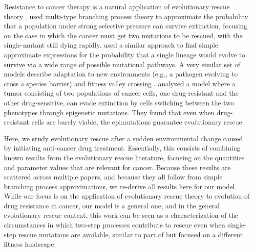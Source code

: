\documentclass[12pt]{extarticle}
\begin{document}
Resistance to cancer therapy is a natural application of evolutionary rescue theory \citep{alexander2014evolutionary}. 
\citet{iwasa2003evolutionary} used multi-type branching process theory to approximate the probability that a population under strong selective pressure can survive extinction, focusing on the case in which the cancer must get two mutations to be rescued, with the single-mutant still dying rapidly.
\citet{iwasa2004evolutionary} used a similar approach to find simple approximate expressions for the probability that a single lineage would evolve to survive via a wide range of possible mutational pathways.
A very similar set of models describe adaptation to new environments (e.g., a pathogen evolving to cross a species barrier) and fitness valley crossing \citep{antia2003role, weissman2009rate}.
\citet{gunnarsson2020understanding} analyzed a model where a tumor consisting of two populations of cancer cells, one drug-resistant and the other drug-sensitive, can evade extinction by cells switching between the two phenotypes through epigenetic mutations. They found that even when drug-resistant cells are barely viable, the epimutations guarantee evolutionary rescue. 


Here, we study evolutionary rescue after a sudden environmental change caused by initiating anti-cancer drug treatment. 
Essentially, this consists of combining known results from the evolutionary rescue literature, focusing on the quantities and parameter values that are relevant for cancer.
Because these results are scattered across multiple papers, and because they all follow from simple branching process approximations, we re-derive all results here for our model.
While our focus is on the application of evolutionary rescue theory to evolution of drug resistance in cancer, our model is a general one, and in the general evolutionary rescue context, this work can be seen as a characterization of the circumstances in which two-step processes contribute to rescue even when single-step rescue mutations are available, similar to part of \citet{osmond_genetic_2020} but focused on a different fitness landscape.
\end{document}
